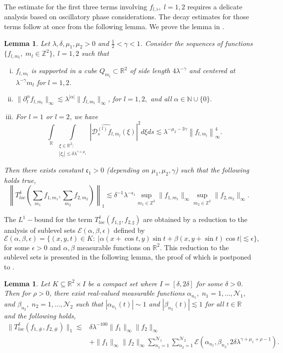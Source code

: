 \documentclass[a4paper,reqno]{amsart}
\newtheorem{lemma}[theorem]{Lemma}
\theoremstyle{definition}
\theoremstyle{remark}
\numberwithin{equation}{section}
\newcommand{\R}{{\mathbb {R}}}
\newcommand{\N}{{\mathbb N}}
\newcommand{\Z}{{\mathbb Z}}
\begin{document}
	The estimate for the first three terms involving $f_{l,\flat},\;l=1,2$ requires a delicate analysis based on oscillatory phase considerations. The decay estimates for those terms follow at once from the following lemma. We prove the lemma in .
	\begin{lemma}\label{lemma:oscillatory}
		Let $\lambda,\delta,\mu_1,\mu_2>0$ and $\frac{1}{2}<\gamma<1$. Consider the sequences of functions $\{f_{l,m_l},\;m_l\in\Z^2\},\;l=1,2$ such that
		\begin{enumerate}[(i)]
			\item $f_{l,m_l}$ is supported in a cube $Q_{m_l}\subset\R^2$ of side length $4\lambda^{-\gamma}$ and centered at $\lambda^{-\gamma}m_l$ for $l=1,2$.
			\item $\|\partial_l^\alpha f_{l,m_l}\|_\infty\lesssim\lambda^{|\alpha|}\|f_{l,m_l}\|_\infty$, for $l=1,2,$ and all $\alpha\in\N\cup\{0\}.$
			\item For $l=1$ or $l=2$, we have
			\begin{equation}\label{smallMD}
				\int\limits_{\mathbb{R}}\int\limits_{\substack{\xi\in\R^2:\\\left|\xi_l\right| \leq \delta\lambda^{\gamma+\mu_1}}}\left|\widehat{\mathscr{D}_s^{(l)} f_{l, m_l}}(\xi)\right|^2 d \xi d s \lesssim \lambda^{-\mu_2-3\gamma}\left\|f_{l,m_l}\right\|_{\infty}^4.
			\end{equation}
		\end{enumerate}
		Then there exists constant $\mathfrak{c}_1>0$ (depending on $\mu_1,\mu_2,\gamma$) such that the following holds true,
		\[
		\left\|T^\delta_{loc}\left(\sum_{m_1}f_{1,m_1},\sum_{m_2}f_{2,m_2}\right)\right\|_1\lesssim \delta^{-1}\lambda^{-\mathfrak{c}_1}\sup_{m_1\in\Z^2}\|f_{1,m_1}\|_\infty \sup_{m_2\in\Z^2}\|f_{2,m_2}\|_\infty.
		\]
	\end{lemma}
	The $L^1-$bound for the term $T_{loc}^{\delta}\left(f_{1, \sharp}, f_{2, \sharp}\right)$ are obtained by a reduction to the analysis of sublevel sets $\mathcal{E}(\alpha,\beta,\epsilon)$ defined by
	\[\mathcal{E}(\alpha,\beta,\epsilon)=\{(x,y,t)\in K:\;|\alpha(x+\cos t,y)\sin t+\beta(x,y+\sin t)\cos t|\lesssim\epsilon\},\]
	for some $\epsilon>0$ and $\alpha,\beta$ measurable functions on $\R^2$.
	This reduction to the sublevel sets is presented in the following lemma, the proof of which is postponed to .
	\begin{lemma}\label{lemma:reductiontosublevel}
		Let $K\subseteq\R^2\times I$ be a compact set where $I=[\delta,2\delta]$ for some $\delta>0$. Then for $\rho>0$, there exist real-valued measurable functions $\alpha_{n_1},\;n_1=1,\dots,\mathcal{N}_1$, and $\beta_{n_2},\;n_2=1,\dots,\mathcal{N}_2$ such that $|\alpha_{n_1}(t)|\sim1$ and $|\beta_{n_2}(t)|\lesssim1$ for all $t\in\R$ and the following holds,
		\begin{align*}
			\|T^\delta_{loc}(f_{1,\#},f_{2,\#})\|_1\lesssim& \delta\lambda^{-100}\|f_1\|_\infty\|f_2\|_\infty\\&+\|f_1\|_\infty\|f_2\|_\infty\sum_{n_1=1}^{\mathcal{N}_1}\sum_{n_2=1}^{\mathcal{N}_2}\mathcal{E}(\alpha_{n_1},\beta_{n_2},2\delta\lambda^{\gamma+\mu_1+\rho-1}).
		\end{align*}
	\end{lemma}
\end{document}
